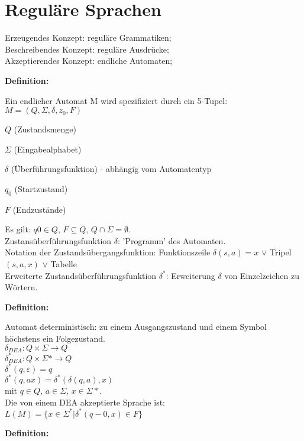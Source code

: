 \documentclass[11pt,
			a4paper,
			parskip=full,
			toc=bib,
			toc=idx,
			toc=listof,
			ngerman
			listof=totoc,]{scrartcl}
\newcommand{\concept}[1]{%
	\sf{%
		\textbf{%
				\textcolor{mymauve}{#1}%
		}%
	}%
	\rm%
}
\newenvironment{objDef}[1]%
{	\begin{framed}
	\textbf{Definition:} \concept{#1}
	\compress}%
{\end{framed}}
\newcommand{\compress}{\vspace{-1em}}
\begin{document}
\newpage
\section{Reguläre Sprachen}
\compress
Erzeugendes Konzept: reguläre Grammatiken;  \\
Beschreibendes Konzept: reguläre Ausdrücke; \\ 
Akzeptierendes Konzept: endliche Automaten; \\
\compress
\begin{objDef}{Endlicher Automat}

Ein endlicher Automat M wird spezifiziert durch ein 5-Tupel: $M = (Q,Σ,δ,z_0,F)$
\compress
\begin{compactitem}
  \item $Q$ (Zustandsmenge)              
  \item $Σ$ (Eingabealphabet)           
  \item $δ$ (Überführungsfunktion) - abhängig vom Automatentyp      
  \item $q_0$ (Startzustand)       
  \item $F$ (Endzustände)
\end{compactitem}
\compress
Es gilt: $q0 ∈ Q$, $F ⊆ Q$, $Q ∩ Σ = ∅$.\\
Zustansüberführungsfunktion $δ$: 'Programm' des Automaten.\\
Notation der Zustandsübergangsfunktion: Funktionszeile $δ(s,a) = x$  $∨$ Tripel $(s,a,x)$  $∨$ Tabelle\\
Erweiterte Zustandsüberführungsfunktion $δ^*$: Erweiterung $δ$ von Einzelzeichen zu Wörtern.

\compress
\begin{objDef}{Deterministischer endlicher Automat (DEA)}

Automat deterministisch: zu einem Ausgangszustand und einem Symbol höchstens ein Folgezustand.\\
$δ_{DEA}:       Q \times Σ → Q$\\ 
$δ^*_{DEA}:      Q \times Σ* → Q$\\
$δ^*(q,ε) = q$\\
$δ^*(q,ax) = δ^*(δ(q,a),x)$\\
mit $q ∈ Q$, $a ∈ Σ$, $x ∈ Σ*$.\\
Die von einem DEA akzeptierte Sprache ist:
$L(M) = \{x ∈ Σ^* | δ^*(q-0,x) ∈ F\}$
\end{objDef}

\compress
\compress
\begin{objDef}{Nicht-Deterministischer endlicher Automat (NEA)}


\end{objDef}
\end{objDef}
\end{document}
